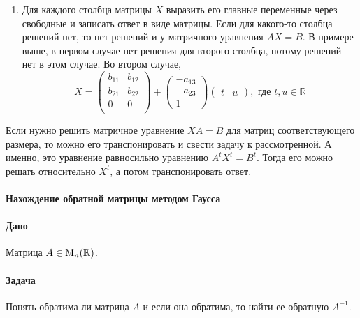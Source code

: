 \begin{enumerate}
\item Для каждого столбца матрицы $X$ выразить его главные переменные через свободные и записать ответ в виде матрицы. Если для какого-то столбца решений  нет, то нет решений и у матричного уравнения $AX = B$. В примере выше, в первом случае нет решения для второго столбца, потому решений нет в этом случае. Во втором случае, 
\[
X = 
\begin{pmatrix}
{b_{11}}&{b_{12}}\\
{b_{21}}&{b_{22}}\\
{0}&{0}\\
\end{pmatrix}
+
\begin{pmatrix}
{-a_{13}}\\{-a_{23}}\\{1}
\end{pmatrix}
\begin{pmatrix}
{t}&{u}
\end{pmatrix},\text{ где } t,u\in \mathbb R
\]
\end{enumerate}

Если нужно решить матричное уравнение $XA = B$ для матриц соответствующего размера, то можно его транспонировать и свести задачу к рассмотренной. А именно, это уравнение равносильно уравнению $A^t X^t = B^t$. Тогда его можно решать относительно $X^t$, а потом транспонировать ответ.

\paragraph{Нахождение обратной матрицы методом Гаусса}

\paragraph{Дано} Матрица $A\in \operatorname{M}_{n}(\mathbb R)$.

\paragraph{Задача} Понять обратима ли матрица $A$ и если она обратима, то найти ее обратную $A^{-1}$.

